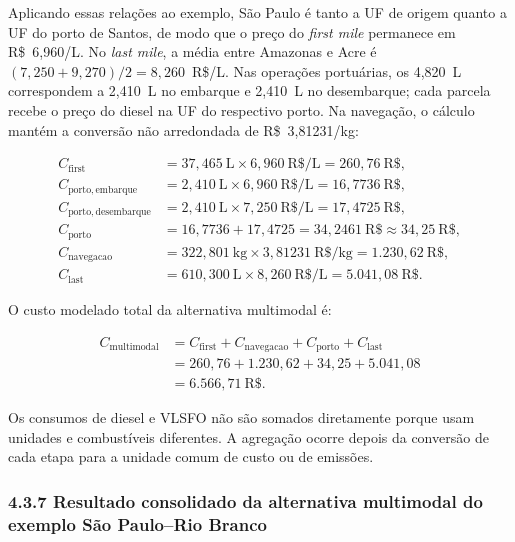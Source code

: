 \documentclass[brazil,]{article}
\let\oldsubsubsection\subsubsection
\renewcommand{\subsubsection}{\Needspace{10\baselineskip}\oldsubsubsection}
\begin{document}
Aplicando essas relações ao exemplo, São Paulo é tanto a UF de origem
quanto a UF do porto de Santos, de modo que o preço do
\emph{first mile} permanece em R\$~6,960/L. No \emph{last mile}, a
média entre Amazonas e Acre é
\((7{,}250+9{,}270)/2=8{,}260\)~R\$/L. Nas operações portuárias, os
4,820~L correspondem a 2,410~L no embarque e 2,410~L no desembarque;
cada parcela recebe o preço do diesel na UF do respectivo porto. Na
navegação, o cálculo mantém a conversão não arredondada de
R\$~3,81231/kg:

\[
\begin{aligned}
C_{\mathrm{first}}
&=37{,}465\ \mathrm{L}\times6{,}960\ \mathrm{R\$/L}
=260{,}76\ \mathrm{R\$},\\
C_{\mathrm{porto,embarque}}
&=2{,}410\ \mathrm{L}\times6{,}960\ \mathrm{R\$/L}
=16{,}7736\ \mathrm{R\$},\\
C_{\mathrm{porto,desembarque}}
&=2{,}410\ \mathrm{L}\times7{,}250\ \mathrm{R\$/L}
=17{,}4725\ \mathrm{R\$},\\
C_{\mathrm{porto}}
&=16{,}7736+17{,}4725
=34{,}2461\ \mathrm{R\$}
\approx34{,}25\ \mathrm{R\$},\\
C_{\mathrm{navegacao}}
&=322{,}801\ \mathrm{kg}\times3{,}81231\ \mathrm{R\$/kg}
=1.230{,}62\ \mathrm{R\$},\\
C_{\mathrm{last}}
&=610{,}300\ \mathrm{L}\times8{,}260\ \mathrm{R\$/L}
=5.041{,}08\ \mathrm{R\$}.
\end{aligned}
\]

O custo modelado total da alternativa multimodal é:

\[
\begin{aligned}
C_{\mathrm{multimodal}}
&=C_{\mathrm{first}}+C_{\mathrm{navegacao}}
+C_{\mathrm{porto}}+C_{\mathrm{last}}\\
&=260{,}76+1.230{,}62+34{,}25+5.041{,}08\\
&=6.566{,}71\ \mathrm{R\$}.
\end{aligned}
\]

Os consumos de diesel e VLSFO não são somados diretamente porque usam
unidades e combustíveis diferentes. A agregação ocorre depois da
conversão de cada etapa para a unidade comum de custo ou de emissões.

\hypertarget{resultado-consolidado-da-alternativa-multimodal-do-exemplo-suxe3o-paulorio-branco}{%
\subsubsection{4.3.7 Resultado consolidado da alternativa multimodal do
exemplo São Paulo--Rio
Branco}\label{resultado-consolidado-da-alternativa-multimodal-do-exemplo-suxe3o-paulorio-branco}}
\end{document}

